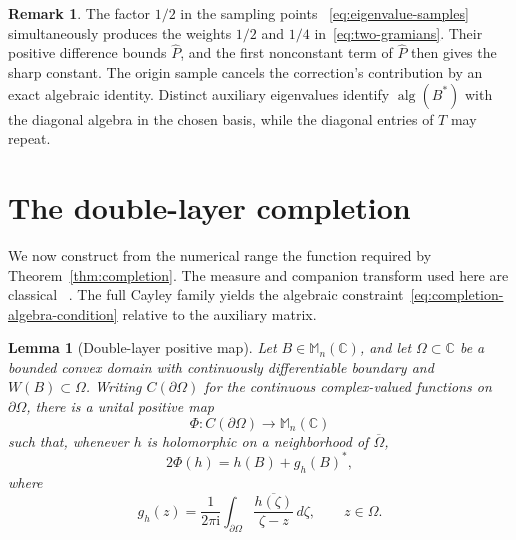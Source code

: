\documentclass[preprints,article,submit,oneauthor]{Definitions/mdpi}
\newcounter{manuscriptresult}[section]
\theoremstyle{mdpi}
\newtheorem{lemma}[manuscriptresult]{Lemma}
\theoremstyle{definition}
\newtheorem{remark}[manuscriptresult]{Remark}
\newcommand{\C}{\mathbb C}
\newcommand{\Mn}{\mathbb M_n(\C)}
\newcommand{\alg}{\operatorname{alg}}
\newcommand{\iu}{\mathrm{i}}
\begin{document}
\begin{remark}
\label{rem:completion-novelty}
The factor $1/2$ in the sampling points~%
\eqref{eq:eigenvalue-samples} simultaneously produces the weights
$1/2$ and $1/4$ in~\eqref{eq:two-gramians}.  Their positive difference
bounds $\widehat P$, and the first nonconstant term of $\widehat P$
then gives the sharp constant.  The origin sample cancels the
correction's contribution by an exact algebraic identity.  Distinct
auxiliary eigenvalues identify
$\alg(B^*)$ with the diagonal algebra in the chosen basis, while the
diagonal entries of $T$ may repeat.
\end{remark}

\section{The double-layer completion}
\label{sec:double-layer}

We now construct from the numerical range the function required by
Theorem~\ref{thm:completion}.  The measure and companion transform used
here are classical~%
\cite{DelyonDelyon1999,Crouzeix2007,CrouzeixPalencia2017}.  The full
Cayley family yields the algebraic
constraint~\eqref{eq:completion-algebra-condition} relative to the
auxiliary matrix.

\begin{lemma}[Double-layer positive map]
\label{lem:double-layer-map}
Let $B\in\Mn$, and let $\Omega\subset\C$ be a bounded convex domain
with continuously differentiable boundary and
$W(B)\subset\Omega$.  Writing $C(\partial\Omega)$ for the continuous
complex-valued functions on $\partial\Omega$, there is a unital positive map
\[
  \Phi\colon C(\partial\Omega)\longrightarrow\Mn
\]
such that, whenever $h$ is holomorphic on a neighborhood of
$\overline\Omega$,
\begin{equation}
  2\Phi(h)=h(B)+g_h(B)^*,
  \label{eq:double-layer-identity}
\end{equation}
where
\begin{equation}
  g_h(z)=\frac{1}{2\pi\iu}
  \int_{\partial\Omega}
  \frac{\overline{h(\zeta)}}{\zeta-z}\,d\zeta,
  \qquad z\in\Omega.
  \label{eq:companion-transform}
\end{equation}
\end{lemma}
\end{document}
